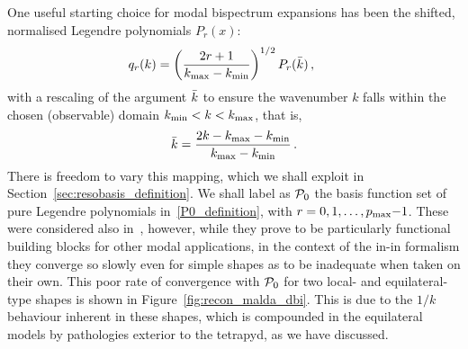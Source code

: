 One useful starting choice for modal bispectrum expansions has been the shifted,
normalised Legendre polynomials $P_r(x)$:
\begin{align}\label{P0_definition}
    q_{r}(k) = \left(\frac{2r+1} {{k_\text{max}} - {k_\text{min}}}\right)^{1/2} P_r(\bar{k})\,,\qquad 
\end{align}
with a rescaling of the argument $\bar{k}$ to ensure the wavenumber $k$ falls within the chosen (observable) domain ${k_\text{min}}< k<{k_\text{max}}$, that is, 
\begin{align}\label{krescaled}
    \bar{k}=\frac{2k-{k_\text{max}}-{k_\text{min}}}{{k_\text{max}}-{k_\text{min}}}\,.
\end{align}
There is freedom to vary this mapping, which we shall exploit in Section~\ref{sec:resobasis_definition}.
We shall label as $\mathcal{P}_0$ the basis function set of pure Legendre polynomials in~\eqref{P0_definition},
with $r=0,1,\dots, p_{\rm max}\text{$-$}1$.
These were considered also in~\cite{Funakoshi}, however,
while they prove to be particularly functional building blocks for other modal applications,
in the context of the in-in formalism
they converge so slowly even for simple shapes as to be inadequate when taken on their own.
This poor rate of convergence with $\mathcal{P}_0$ for two local- and equilateral-type shapes is shown in Figure~\ref{fig:recon_malda_dbi}.
This is due to the $1/k$ behaviour inherent in these shapes,
which is compounded in the equilateral models by pathologies exterior to the tetrapyd,
as we have discussed.


